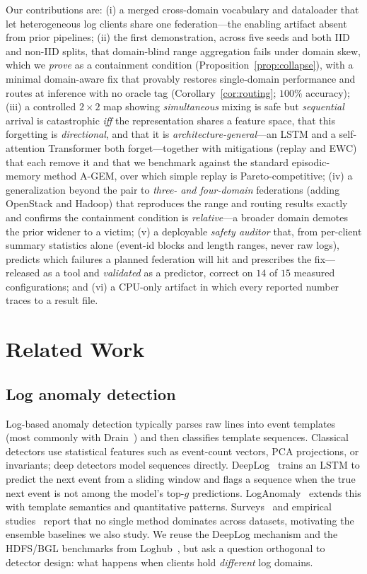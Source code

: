 \documentclass[journal]{IEEEtran}
\begin{document}
Our contributions are: (i) a merged cross-domain vocabulary and dataloader that let heterogeneous log
clients share one federation---the enabling artifact absent from prior pipelines; (ii) the first
demonstration, across five seeds and both IID and non-IID splits, that domain-blind range aggregation
fails under domain skew, which we \emph{prove} as a containment condition
(Proposition~\ref{prop:collapse}), with a minimal domain-aware fix that provably restores single-domain
performance and routes at inference with no oracle tag (Corollary~\ref{cor:routing}; $100\%$ accuracy);
(iii) a controlled $2\times2$ map showing \emph{simultaneous} mixing is safe but \emph{sequential}
arrival is catastrophic \emph{iff} the representation shares a feature space, that this forgetting is
\emph{directional}, and that it is \emph{architecture-general}---an LSTM and a self-attention
Transformer both forget---together with mitigations (replay and EWC) that each remove it and that we
benchmark against the standard episodic-memory method A-GEM, over which simple replay is
Pareto-competitive; (iv) a generalization beyond the pair to \emph{three- and four-domain} federations (adding OpenStack and
Hadoop) that reproduces the range and routing results exactly and confirms the containment condition is
\emph{relative}---a broader domain demotes the prior widener to a victim; (v) a deployable \emph{safety auditor} that, from
per-client summary statistics alone (event-id blocks and length ranges, never raw logs), predicts which
failures a planned federation will hit and prescribes the fix---released as a tool and \emph{validated}
as a predictor, correct on $14$ of $15$ measured configurations; and (vi) a CPU-only artifact in which
every reported number traces to a result file.

\section{Related Work}

\subsection{Log anomaly detection}
Log-based anomaly detection typically parses raw lines into event templates (most commonly with
Drain~\cite{he2017drain}) and then classifies template sequences. Classical detectors use
statistical features such as event-count vectors, PCA projections, or invariants; deep detectors
model sequences directly. DeepLog~\cite{du2017deeplog} trains an LSTM to predict the next event
from a sliding window and flags a sequence when the true next event is not among the model's
top-$g$ predictions. LogAnomaly~\cite{meng2019loganomaly} extends this with template semantics and
quantitative patterns. Surveys~\cite{landauer2023survey} and empirical
studies~\cite{he2016experience} report that no single method dominates across datasets, motivating
the ensemble baselines we also study. We reuse the DeepLog mechanism and the HDFS/BGL benchmarks
from Loghub~\cite{zhu2023loghub}, but ask a question orthogonal to detector design: what happens
when clients hold \emph{different} log domains.
\end{document}
